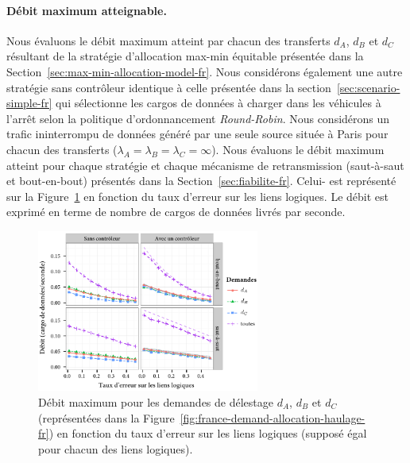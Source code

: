 \paragraph{Débit maximum atteignable.} 
Nous évaluons le débit maximum atteint par chacun des transferts $d_A$, $d_B$ et $d_C$ résultant de la stratégie d’allocation max-min équitable présentée dans la Section~\ref{sec:max-min-allocation-model-fr}. Nous considérons également une autre stratégie sans contrôleur identique à celle présentée dans la section~\ref{sec:scenario-simple-fr} qui sélectionne les cargos de données à charger dans les véhicules à l’arrêt selon la politique d’ordonnancement \textit{Round-Robin}. Nous considérons un trafic ininterrompu de données généré par une seule source située à Paris pour chacun des transferts (\ie $\lambda_A=\lambda_B=\lambda_C=\infty$). Nous évaluons le débit maximum atteint pour chaque stratégie et chaque mécanisme de retransmission (\ie saut-à-saut et bout-en-bout) présentés dans la Section~\ref{sec:fiabilite-fr}. Celui- est représenté sur la Figure~\ref{fig:french-net-throughput-leakage-fr} en fonction du taux d’erreur sur les liens logiques. Le débit est exprimé en terme de nombre de cargos de données livrés par seconde. 
 
 
\begin{figure}[h!] 
    \centering 
    \includegraphics[width=0.65\textwidth]{figures-fr/plot-france-rate-throughput-m-10-wo-MCF-fr.pdf} 
    \caption{Débit maximum pour les demandes de délestage $d_A$, $d_B$ et $d_C$ (représentées dans la Figure~\ref{fig:france-demand-allocation-haulage-fr}) en fonction du taux d’erreur sur les liens logiques (supposé égal pour chacun des liens logiques).} 
    \label{fig:french-net-throughput-leakage-fr} 
\end{figure} 
 
